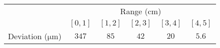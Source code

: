 \begin{table}[ht]
  \centering
  \caption[]
  {}
  \label{chap3:Deviation}
  \begin{tabular}{cccccc}
    \toprule
    & \multicolumn{5}{c}{Range (\(\mathrm{cm}\))} \\
    \cmidrule(lr){2-6}
              & \([0,1]\) & \([1,2]\) & \([2,3]\) & \([3,4]\) & \([4,5]\) \\
    \midrule
    Deviation (\(\mathrm{\mu m}\)) & \(347\)       & \(85\)        & \(42\)        & \(20\)        & \(5.6\)       \\
    \bottomrule
  \end{tabular}
\end{table}